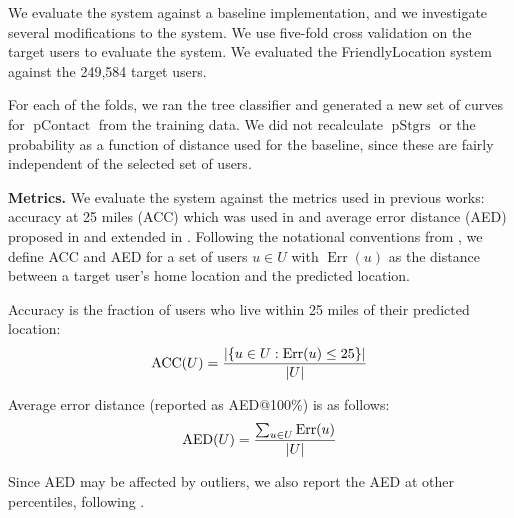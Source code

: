 \documentclass[letterpaper]{article}
\DeclareMathOperator{\pContact}{pContact}
\DeclareMathOperator{\pStrangers}{pStgrs}
\DeclareMathOperator{\Err}{Err}
\DeclareMathOperator{\AED}{AED}
\DeclareMathOperator{\ACC}{ACC}
\begin{document}
We evaluate the system against a baseline implementation, and we investigate
several modifications to the system.
%
We use five-fold cross validation on the target users to evaluate the system.
We evaluated the FriendlyLocation system against the 249,584 target users.

For each of the folds, we ran the tree classifier and generated a new set of
curves for $\pContact$ from the training data.
%
We did not recalculate $\pStrangers$ or the probability as a function of distance
used for the baseline, since these are fairly independent of the selected set
of users.

\noindent\textbf{Metrics.} We evaluate the system against the metrics used in previous works:
accuracy at 25 miles (ACC) which was used in \cite{backstrom2010find}
and average error distance (AED) proposed in \cite{cheng2010you} and
extended in \cite{li2012towards}.
%
Following the notational conventions from \cite{li2012towards}, we define ACC
and AED for a set of users $u \in U$ with $\Err(u)$ as the distance between a
target user's home location and the predicted location.

Accuracy is the fraction of users who live within 25 miles of their predicted
location:
\[
    \ACC(U) = { |\{ u \in U : \Err(u)\le25 \}| \over |U| }
\]

Average error distance (reported as AED@100\%) is as follows:
\[
    \AED(U) = { \sum_{u \in U} \Err(u) \over |U| }
\]

Since AED may be affected by outliers, we also report the AED at other percentiles, following \cite{li2012towards}.

\end{document}
